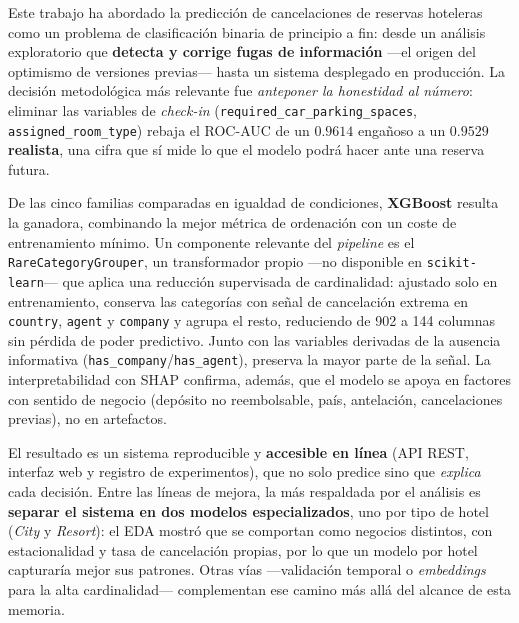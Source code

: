 \documentclass[10pt,twocolumn,a4paper]{article}
\newcommand{\var}[1]{\texttt{#1}}           %
\begin{document}
Este trabajo ha abordado la predicción de cancelaciones de reservas hoteleras como un
problema de clasificación binaria de principio a fin: desde un análisis exploratorio que
\textbf{detecta y corrige fugas de información} ---el origen del optimismo de versiones
previas--- hasta un sistema desplegado en producción. La decisión metodológica más
relevante fue \emph{anteponer la honestidad al número}: eliminar las variables de
\emph{check-in} (\var{required\_car\_parking\_spaces}, \var{assigned\_room\_type}) rebaja
el ROC-AUC de un $0.9614$ engañoso a un \textbf{$0.9529$ realista}, una cifra que sí
mide lo que el modelo podrá hacer ante una reserva futura.

De las cinco familias comparadas en igualdad de condiciones, \textbf{XGBoost} resulta la
ganadora, combinando la mejor métrica de ordenación con un coste de entrenamiento mínimo.
Un componente relevante del \emph{pipeline} es el \texttt{RareCategoryGrouper}, un
transformador propio ---no disponible en \texttt{scikit-learn}--- que aplica una reducción
supervisada de cardinalidad: ajustado solo en entrenamiento, conserva las categorías con
señal de cancelación extrema en \var{country}, \var{agent} y \var{company} y agrupa el resto,
reduciendo de 902 a 144 columnas sin pérdida de poder predictivo. Junto con las variables
derivadas de la ausencia informativa (\var{has\_company}/\var{has\_agent}), preserva la mayor
parte de la señal. La interpretabilidad con SHAP confirma, además, que el modelo se apoya en
factores con sentido de negocio (depósito no reembolsable, país, antelación, cancelaciones
previas), no en artefactos.

El resultado es un sistema reproducible y \textbf{accesible en línea} (API REST, interfaz
web y registro de experimentos), que no solo predice sino que \emph{explica} cada decisión.
Entre las líneas de mejora, la más respaldada por el análisis es \textbf{separar el sistema
en dos modelos especializados}, uno por tipo de hotel (\emph{City} y \emph{Resort}): el EDA
mostró que se comportan como negocios distintos, con estacionalidad y tasa de cancelación
propias, por lo que un modelo por hotel capturaría mejor sus patrones. Otras vías
---validación temporal o \emph{embeddings} para la alta cardinalidad--- complementan ese
camino más allá del alcance de esta memoria.

\end{document}
